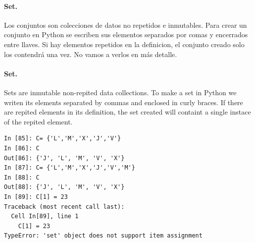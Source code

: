 \begin{paracol}{2}
\paragraph{Set.} Los conjuntos son colecciones de datos no repetidos e inmutables. Para crear un conjunto en Python se escriben sus elementos separados por comas y encerrados entre llaves. Si hay elementos repetidos en la definicion, el conjunto creado solo los contendrá una vez. No vamos a verlos en más detalle.
\switchcolumn
\paragraph{Set.} Sets are inmutable non-repited data collections. To make a set in Python we writen its elements separated by commas and enclosed in curly braces. If there are repited elements in its definition, the set created will containt a single instace of the repited element.
\end{paracol}

\begin{center}
\begin{minipage}{0.4\textwidth}
\begin{verbatim}
In [85]: C= {'L','M','X','J','V'}
In [86]: C
Out[86]: {'J', 'L', 'M', 'V', 'X'}
In [87]: C= {'L','M','X','J','V','M'}
In [88]: C
Out[88]: {'J', 'L', 'M', 'V', 'X'}
In [89]: C[1] = 23
Traceback (most recent call last):
  Cell In[89], line 1
    C[1] = 23
TypeError: 'set' object does not support item assignment
\end{verbatim}
\end{minipage}
\end{center}

